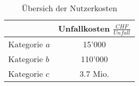 %
%
%
%

\begin{table}[h!]
\center
\renewcommand{\arraystretch}{1.4}
\begin{tabular}{l|c}
            			& Unfallkosten   $\frac{CHF}{Unfall}$	       \\ \hline
Kategorie $a$	    	&       15'000          		                \\
Kategorie $b$           &      	110'000						      \\
Kategorie $c$		    &        3.7 Mio.  		                       
\end{tabular}
\caption{Übersich der Nutzerkosten}
\label{tab:t-04-03-04-Unfallkosten}
\end{table}

%
%





%


